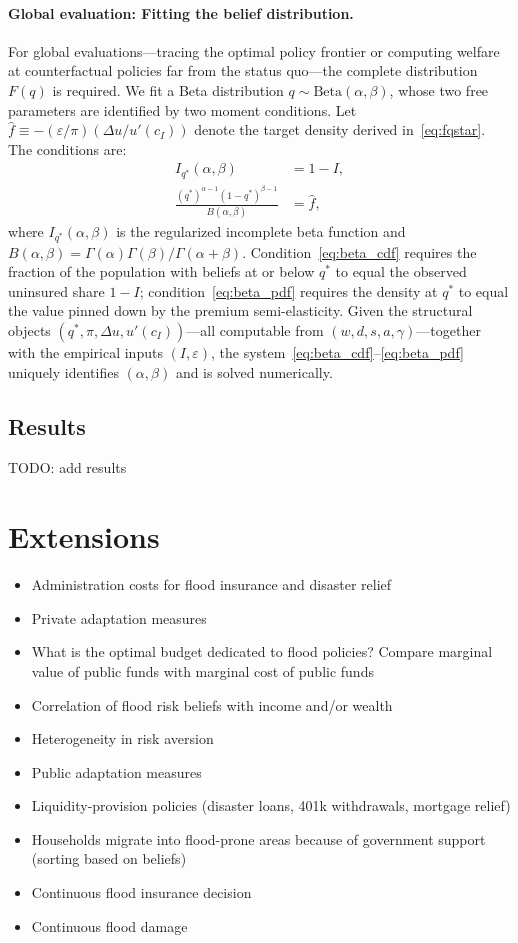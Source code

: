 \documentclass[12pt]{article}
\begin{document}
\paragraph{Global evaluation: Fitting the belief distribution.}
For global evaluations---tracing the optimal policy frontier or computing welfare at counterfactual policies far from the status quo---the complete distribution $F(q)$ is required. We fit a Beta distribution $q\sim\mathrm{Beta}(\alpha,\beta)$, whose two free parameters are identified by two moment conditions. Let $\hat{f} \equiv -(\varepsilon/\pi)(\Delta u/u'(c_I))$ denote the target density derived in~\eqref{eq:fqstar}. The conditions are:
\begin{align}
    I_{q^*}(\alpha,\beta) &= 1 - I, \label{eq:beta_cdf} \\
    \frac{(q^*)^{\alpha-1}(1-q^*)^{\beta-1}}{B(\alpha,\beta)} &= \hat{f}, \label{eq:beta_pdf}
\end{align}
where $I_{q^*}(\alpha,\beta)$ is the regularized incomplete beta function and $B(\alpha,\beta)=\Gamma(\alpha)\Gamma(\beta)/\Gamma(\alpha+\beta)$. Condition~\eqref{eq:beta_cdf} requires the fraction of the population with beliefs at or below $q^*$ to equal the observed uninsured share $1-I$; condition~\eqref{eq:beta_pdf} requires the density at $q^*$ to equal the value pinned down by the premium semi-elasticity. Given the structural objects $(q^*,\pi,\Delta u,u'(c_I))$---all computable from $(w,d,s,a,\gamma)$---together with the empirical inputs $(I,\varepsilon)$, the system~\eqref{eq:beta_cdf}--\eqref{eq:beta_pdf} uniquely identifies $(\alpha,\beta)$ and is solved numerically.

\subsection{Results}

TODO: add results

\section{Extensions}
\begin{itemize}
    \item Administration costs for flood insurance and disaster relief
    \item Private adaptation measures
    \item What is the optimal budget dedicated to flood policies? Compare marginal value of public funds with marginal cost of public funds
    \item Correlation of flood risk beliefs with income and/or wealth
    \item Heterogeneity in risk aversion
    \item Public adaptation measures
    \item Liquidity-provision policies (disaster loans, 401k withdrawals, mortgage relief)
    \item Households migrate into flood-prone areas because of government support (sorting based on beliefs)
    \item Continuous flood insurance decision
    \item Continuous flood damage
\end{itemize}
\end{document}
